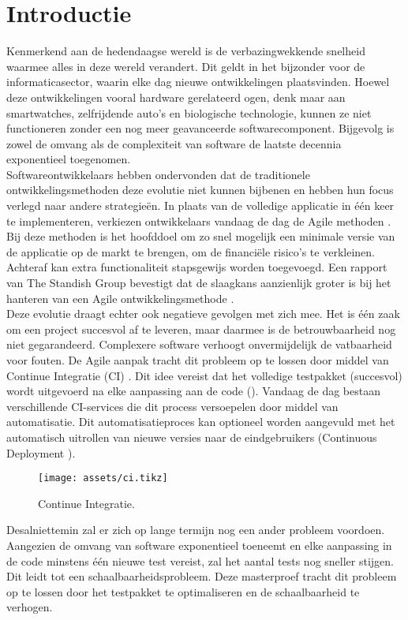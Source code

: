 
\section{Introductie}
\noindent Kenmerkend aan de hedendaagse wereld is de verbazingwekkende snelheid waarmee alles in deze wereld verandert. Dit geldt in het bijzonder voor de informaticasector, waarin elke dag nieuwe ontwikkelingen plaatsvinden. Hoewel deze ontwikkelingen vooral hardware gerelateerd ogen, denk maar aan smartwatches, zelfrijdende auto's en biologische technologie, kunnen ze niet functioneren zonder een nog meer geavanceerde softwarecomponent. Bijgevolg is zowel de omvang als de complexiteit van software de laatste decennia exponentieel toegenomen.\\

\noindent Softwareontwikkelaars hebben ondervonden dat de traditionele ontwikkelingsmethoden deze evolutie niet kunnen bijbenen en hebben hun focus verlegd naar andere strategie\"en. In plaats van de volledige applicatie in één keer te implementeren, verkiezen ontwikkelaars vandaag de dag de Agile methoden \cite{beck2001agile}. Bij deze methoden is het hoofddoel om zo snel mogelijk een minimale versie van de applicatie op de markt te brengen, om de financi\"ele risico's te verkleinen. Achteraf kan extra functionaliteit stapsgewijs worden toegevoegd. Een rapport van The Standish Group bevestigt dat de slaagkans aanzienlijk groter is bij het hanteren van een Agile ontwikkelingsmethode \cite{standish2015chaos}.\\

\noindent Deze evolutie draagt echter ook negatieve gevolgen met zich mee. Het is één zaak om een project succesvol af te leveren, maar daarmee is de betrouwbaarheid nog niet gegarandeerd. Complexere software verhoogt onvermijdelijk de vatbaarheid voor fouten. De Agile aanpak tracht dit probleem op te lossen door middel van Continue Integratie (CI) \cite{SmartJenkinsDefinitive,Myers:2011:AST:2161638}. Dit idee vereist dat het volledige testpakket (succesvol) wordt uitgevoerd na elke aanpassing aan de code (). Vandaag de dag bestaan verschillende CI-services die dit process versoepelen door middel van automatisatie. Dit automatisatieproces kan optioneel worden aangevuld met het automatisch uitrollen van nieuwe versies naar de eindgebruikers (Continuous Deployment \cite{ciusinggitlab}).

\begin{figure}[h!]
	\centering
	\texttt{[image: assets/ci.tikz]}
	\caption{Continue Integratie.}
	\label{fig:ext-nl-ci}
\end{figure}

\noindent Desalniettemin zal er zich op lange termijn nog een ander probleem voordoen. Aangezien de omvang van software exponentieel toeneemt en elke aanpassing in de code minstens één nieuwe test vereist, zal het aantal tests nog sneller stijgen. Dit leidt tot een schaalbaarheidsprobleem. Deze masterproef tracht dit probleem op te lossen door het testpakket te optimaliseren en de schaalbaarheid te verhogen.\\